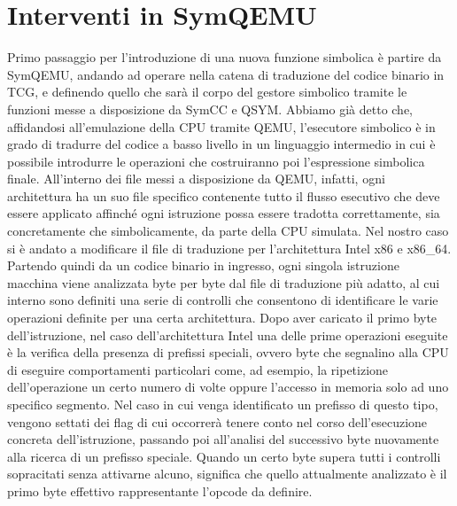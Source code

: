 \documentclass[Lau, oneside]{sapthesis}%
\begin{document}
\section{Interventi in SymQEMU}
Primo passaggio per l'introduzione di una nuova funzione simbolica è partire da SymQEMU, andando ad operare nella catena di traduzione del codice binario in TCG, e definendo quello che sarà il corpo del gestore simbolico tramite le funzioni messe a disposizione da SymCC e QSYM.
\newline \newline
Abbiamo già detto che, affidandosi all'emulazione della CPU tramite QEMU, l'esecutore simbolico è in grado di tradurre del codice a basso livello in un linguaggio intermedio in cui è possibile introdurre le operazioni che costruiranno poi l'espressione simbolica finale.
\newline
All'interno dei file messi a disposizione da QEMU, infatti, ogni architettura ha un suo file specifico contenente tutto il flusso esecutivo che deve essere applicato affinché ogni istruzione possa essere tradotta correttamente, sia concretamente che simbolicamente, da parte della CPU simulata.
\newline \newline
Nel nostro caso si è andato a modificare il file di traduzione per l'architettura Intel x86 e x86\_64.
\newline \newline
Partendo quindi da un codice binario in ingresso, ogni singola istruzione macchina viene analizzata byte per byte dal file di traduzione più adatto, al cui interno sono definiti una serie di controlli che consentono di identificare le varie operazioni definite per una certa architettura.
\newline
Dopo aver caricato il primo byte dell'istruzione, nel caso dell'architettura Intel una delle prime operazioni eseguite è la verifica della presenza di prefissi speciali, ovvero byte che segnalino alla CPU di eseguire comportamenti particolari come, ad esempio, la ripetizione dell'operazione un certo numero di volte oppure l'accesso in memoria solo ad uno specifico segmento.
\newline
Nel caso in cui venga identificato un prefisso di questo tipo, vengono settati dei flag di cui occorrerà tenere conto nel corso dell'esecuzione concreta dell'istruzione, passando poi all'analisi del successivo byte nuovamente alla ricerca di un prefisso speciale.
\newline
Quando un certo byte supera tutti i controlli sopracitati senza attivarne alcuno, significa che quello attualmente analizzato è il primo byte effettivo rappresentante l'opcode da definire.
\end{document}
